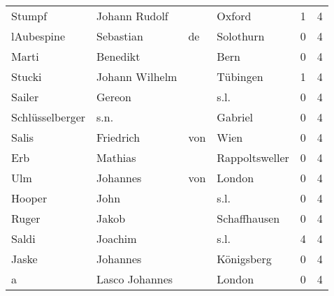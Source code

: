 \documentclass[10pt,a4paper,landscape]{article}
\begin{document}
\begin{longtable}{llllrr}
                   Stumpf &                      Johann Rudolf &             &                                      Oxford &          1 &         4 \\
               lAubespine &                          Sebastian &          de &                                   Solothurn &          0 &         4 \\
                    Marti &                           Benedikt &             &                                        Bern &          0 &         4 \\
                   Stucki &                     Johann Wilhelm &             &                                    Tübingen &          1 &         4 \\
                   Sailer &                             Gereon &             &                                        s.l. &          0 &         4 \\
          Schlüsselberger &                               s.n. &             &                                     Gabriel &          0 &         4 \\
                    Salis &                          Friedrich &         von &                                        Wien &          0 &         4 \\
                      Erb &                            Mathias &             &                              Rappoltsweller &          0 &         4 \\
                      Ulm &                           Johannes &         von &                                      London &          0 &         4 \\
                   Hooper &                               John &             &                                        s.l. &          0 &         4 \\
                    Ruger &                              Jakob &             &                                Schaffhausen &          0 &         4 \\
                    Saldi &                            Joachim &             &                                        s.l. &          4 &         4 \\
                    Jaske &                           Johannes &             &                                  Königsberg &          0 &         4 \\
                        a &                     Lasco Johannes &             &                                      London &          0 &         4 \\

\end{longtable}
\end{document}
